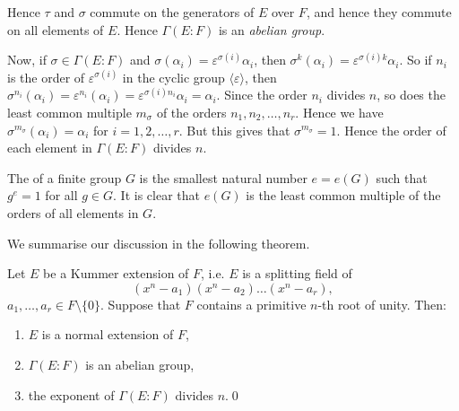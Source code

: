 Hence $\tau$ and $\sigma$ commute on the generators of $E$ over $F$, and hence they commute on all elements of $E$. Hence $\Gamma(E : F)$ is an \emph{abelian group}.

Now, if $\sigma \in \Gamma(E : F)$ and $\sigma(\alpha_i) = \varepsilon^{\sigma(i)} \alpha_i$, then $\sigma^k(\alpha_i) = \varepsilon^{\sigma(i)k} \alpha_i$. So if $n_i$ is the order of $\varepsilon^{\sigma(i)}$ in the cyclic group $\langle \varepsilon \rangle$, then $\sigma^{n_i}(\alpha_i) = \varepsilon^{n_i}(\alpha_i) = \varepsilon^{\sigma(i)n_i} \alpha_i = \alpha_i$. Since the order $n_i$ divides $n$, so does the least common multiple $m_\sigma$ of the orders $n_1, n_2, \dots, n_r$. Hence we have $\sigma^{m_\sigma}(\alpha_i) = \alpha_i$ for $i = 1, 2, \dots, r$. But this gives that $\sigma^{m_\sigma} = 1$. Hence the order of each element in $\Gamma(E : F)$ divides $n$.

\begin{definition}
	The  of a finite group $G$ is the smallest natural number $e = e(G)$ such that $g^e = 1$ for all $g \in G$. It is clear that $e(G)$ is the least common multiple of the orders of all elements in $G$.
\end{definition}

We summarise our discussion in the following theorem.

\begin{theorem}\label{thm:23}
	Let $E$ be a Kummer extension of $F$, i.e. $E$ is a splitting field of
	\[
		(x^n - a_1)(x^n - a_2)\dots(x^n - a_r),
	\]
	$a_1, \dots, a_r \in F \setminus \{0\}$. Suppose that $F$ contains a primitive $n$-th root of unity. Then:
	\begin{enumerate}
		\item $E$ is a normal extension of $F$,
		\item $\Gamma(E : F)$ is an abelian group,
		\item the exponent of $\Gamma(E : F)$ divides $n$.\qed
	\end{enumerate}
\end{theorem}

